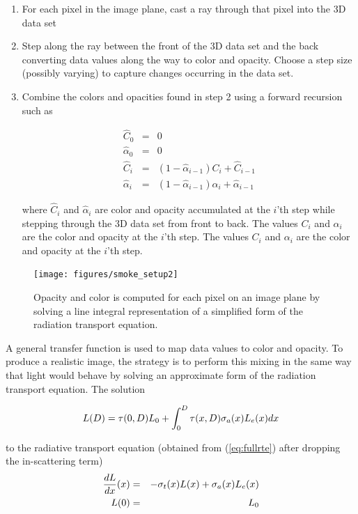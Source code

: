 \begin{enumerate}
\item For each pixel in the image plane, cast a ray through that pixel into the 3D data set
\item Step along the ray between the front of the 3D data set and the back
converting data values along the way to color and opacity.  Choose a step size (possibly varying) to capture changes occurring in the data set.
\item
Combine the colors and opacities found in step 2 using a forward recursion such as \cite[Chapter 39]{gpugems} 

\begin{eqnarray*}
\hat{C}_0&=&0\\
\hat{\alpha}_0&=&0\\
\hat{C}_i&=&\left(1-\hat{\alpha}_{i-1}\right)C_i + \hat{C}_{i-1}\\
\hat{\alpha}_i&=&\left(1-\hat{\alpha}_{i-1}\right)\alpha_i+\hat{\alpha}_{i-1}
\end{eqnarray*}

where $\hat{C}_i$ and $\hat{\alpha}_i$ are color and opacity accumulated at the $i$'th step while stepping through the 3D data set from front to back.  The values $C_i$ and $\alpha_i$
are the color and opacity at the $i$'th step.  
The values $C_i$ and $\alpha_i$
are the color and opacity at the $i$'th step.  
\end{enumerate}

\begin{figure}[\figoptions]
\begin{center}
\texttt{[image: figures/smoke\_setup2]}
\end{center}
\caption {Opacity and color is computed for each pixel on an image plane by solving a line integral
representation of a simplified form of the radiation transport equation.
}
\label{figsmokesetup2}
\end{figure}

A general transfer function is used to map data values to color and opacity. To produce a realistic image, the strategy is to perform this mixing in the same way that light would behave by solving an approximate form of the radiation transport equation.  The solution

\begin{equation}
\label{eq:rtesoln}
 L(D)=\tau(0,D)L_0 + \int_0^D\tau(x,D)\sigma_a(x)L_e(x) dx
\end{equation}

to the radiative transport equation (obtained from (\ref{eq:fullrte}) after dropping the in-scattering term)
\begin{eqnarray*}
\frac{dL}{dx}(x)&=&-\sigma_t(x) L(x) + \sigma_a(x) L_e(x)\\
 L(0)&=&L_0\nonumber
\end{eqnarray*}


